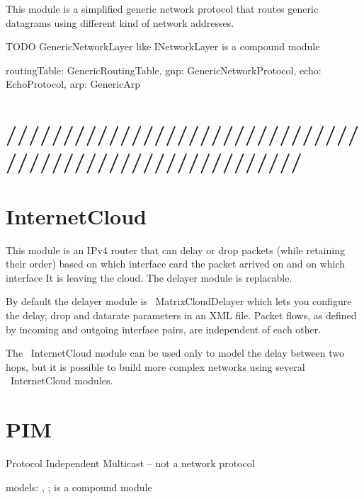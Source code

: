 This module is a simplified generic network protocol that routes
generic datagrams using different kind of network addresses. 

TODO GenericNetworkLayer like INetworkLayer  is a compound module

routingTable: GenericRoutingTable,
gnp: GenericNetworkProtocol,
echo: EchoProtocol,
arp: GenericArp


\section{/////////////////////////////////////////////////////////}


\section{InternetCloud}

This module is an IPv4 router that can delay or drop packets (while retaining
their order) based on which interface card the packet arrived on and 
on which interface It is leaving the cloud. The delayer module is replacable.

By default the delayer module is ~MatrixCloudDelayer which lets you configure
the delay, drop and datarate parameters in an XML file. Packet flows, as defined
by incoming and outgoing interface pairs, are independent of each other.

The ~InternetCloud module can be used only to model the delay between two hops, but
it is possible to build more complex networks using several ~InternetCloud modules.

\section{PIM}

Protocol Independent Multicast -- not a network protocol 

models: , ;  is a compound module




